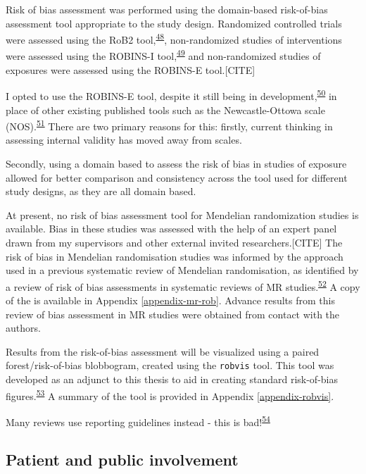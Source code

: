 \documentclass[a4paper, twoside]{templates/ociamthesis}
\begin{document}
Risk of bias assessment was performed using the domain-based risk-of-bias assessment tool appropriate to the study design. Randomized controlled trials were assessed using the RoB2 tool,\textsuperscript{\protect\hyperlink{ref-sterne2019}{48}}, non-randomized studies of interventions were assessed using the ROBINS-I tool,\textsuperscript{\protect\hyperlink{ref-sterne2016}{49}} and non-randomized studies of exposures were assessed using the ROBINS-E tool.{[}CITE{]}

I opted to use the ROBINS-E tool, despite it still being in development,\textsuperscript{\protect\hyperlink{ref-morganr2020}{50}} in place of other existing published tools such as the Newcastle-Ottowa scale (NOS).\textsuperscript{\protect\hyperlink{ref-wells2000newcastle}{51}} There are two primary reasons for this: firstly, current thinking in assessing internal validity has moved away from scales.

Secondly, using a domain based to assess the risk of bias in studies of exposure allowed for better comparison and consistency across the tool used for different study designs, as they are all domain based.

At present, no risk of bias assessment tool for Mendelian randomization studies is available. Bias in these studies was assessed with the help of an expert panel drawn from my supervisors and other external invited researchers.{[}CITE{]} The risk of bias in Mendelian randomisation studies was informed by the approach used in a previous systematic review of Mendelian randomisation, as identified by a review of risk of bias assessments in systematic reviews of MR studies.\textsuperscript{\protect\hyperlink{ref-mamluk2020}{52}} A copy of the is available in Appendix \ref{appendix-mr-rob}. Advance results from this review of bias assessment in MR studies were obtained from contact with the authors.

Results from the risk-of-bias assessment will be visualized using a paired forest/risk-of-bias blobbogram, created using the \texttt{robvis} tool. This tool was developed as an adjunct to this thesis to aid in creating standard risk-of-bias figures.\textsuperscript{\protect\hyperlink{ref-mcguinness2019}{53}} A summary of the tool is provided in Appendix \ref{appendix-robvis}.

Many reviews use reporting guidelines instead - this is bad!\textsuperscript{\protect\hyperlink{ref-costa2011}{54}}

\hypertarget{patient-and-public-involvement}{%
\subsection{Patient and public involvement}\label{patient-and-public-involvement}}
\end{document}
